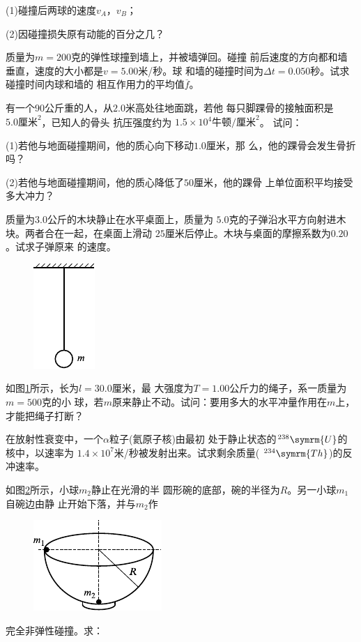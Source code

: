 \begin{exercises}
\clearpage
(1)碰撞后两球的速度$ v _ { A } $，$ v _ { B } $；

(2)因碰撞损失原有动能的百分之几？

\exercise 质量为$ m = 200 $克的弹性球撞到墙上，并被墙弹回。碰撞
前后速度的方向都和墙垂直，速度的大小都是$ v = 5.00 $米/秒。球
和墙的碰撞时间为$ \Delta t = 0.050 $秒。试求碰撞时间内球和墙的
相互作用力的平均值$ \overline { f } $。

\exercise 有一个$ 90 $公斤重的人，从$ 2.0 $米高处往地面跳，若他
每只脚踝骨的接触面积是$ 5.0 \text {厘米} ^ { 2 } $，已知人的骨头
抗压强度约为
$ 1.5 \times 10 ^ { 4 } \text {牛顿} / \text {厘米} ^ { 2 } $。
试问：

(1)若他与地面碰撞期间，他的质心向下移动$ 1.0 $厘米，那
么，他的踝骨会发生骨折吗？

(2)若他与地面碰撞期间，他的质心降低了$ 50 $厘米，他的踝骨
上单位面积平均接受多大冲力？

\exercise 质量为$ 3.0 $公斤的木块静止在水平桌面上，质量为
$ 5.0 $克的子弹沿水平方向射进木块。两者合在一起，在桌面上滑动
$ 25 $厘米后停止。木块与桌面的摩擦系数为$ 0.20 $。试求子弹原来
的速度。

\begin{figure}
  \vspace{-1.56em}
  \centering
  \includegraphics{figure/fig08.13}
  \caption{}
  \label{fig:08.13}
\end{figure}
\exercise 如图\ref{fig:08.13}所示，长为$ l = 30.0 $厘米，最
大强度为$ T = 1.00 $公斤力的绳子，系一质量为$ m = 500 $克的小
球，若$ m $原来静止不动。试问：要用多大的水平冲量作用在$ m $上，
才能把绳子打断？

\exercise 在放射性衰变中，一个$ \alpha $粒子(氦原子核)由最初
处于静止状态的$ ^{ 238 } \symrm{U} $的核中，以速率为
$ 1.4 \times 10 ^ { 7 }$米/秒被发射出来。试求剩余质量(
$ ^{ 234 } \symrm{Th} $)的反冲速率。

\exercise 如图\ref{fig:08.14}所示，小球$ m _ { 2 } $静止在光滑的半
圆形碗的底部，碗的半径为$ R $。另一小球$ m _  { 1 } $自碗边由静
止开始下落，并与$ m _ { 2 } $作
\begin{figure}
  \centering
  \includegraphics{figure/fig08.14}
  \caption{}
  \label{fig:08.14}
\end{figure}
完全非弹性碰撞。求：


\end{exercises}
